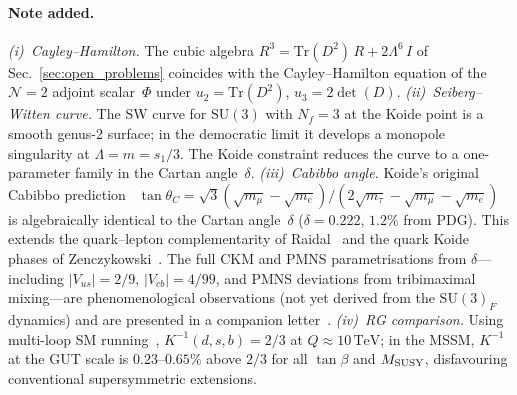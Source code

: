 \documentclass[aps,prd,twocolumn,showpacs,preprintnumbers,superscriptaddress,floatfix]{revtex4-2}
\newcommand{\SU}{\mathrm{SU}}
\newcommand{\Nf}{N_{\!f}}
\newcommand{\TeV}{\,\mathrm{TeV}}
\begin{document}
\paragraph*{Note added.}
\emph{(i)~Cayley--Hamilton.}
The cubic algebra $R^3 = \mathrm{Tr}(D^2)\,R + 2\Lambda^6\,I$ of
Sec.~\ref{sec:open_problems} coincides with the Cayley--Hamilton
equation of the $\mathcal{N}{=}2$ adjoint scalar~$\Phi$ under
$u_2 = \mathrm{Tr}(D^2)$, $u_3 = 2\det(D)$.
\emph{(ii)~Seiberg--Witten curve.}
The SW curve for $\SU(3)$ with $\Nf=3$ at the Koide point
is a smooth genus-2 surface; in the democratic limit it develops a
monopole singularity at $\Lambda = m = s_1/3$.
The Koide constraint reduces the curve to a one-parameter family
in the Cartan angle~$\delta$.
\emph{(iii)~Cabibbo angle.}
Koide's original Cabibbo prediction~\cite{Koide:1983qe}
$\tan\theta_C = \sqrt{3}(\sqrt{m_\mu} - \sqrt{m_e})/
(2\sqrt{m_\tau} - \sqrt{m_\mu} - \sqrt{m_e})$
is algebraically identical to the Cartan angle~$\delta$
($\delta = 0.222$, $1.2\%$ from PDG).
This extends the quark--lepton complementarity of
Raidal~\cite{Raidal:2004} and the quark Koide phases of
Zenczykowski~\cite{Zenczykowski:2012}.
The full CKM and PMNS parametrisations from $\delta$---including
$|V_{us}| = 2/9$, $|V_{cb}| = 4/99$, and PMNS deviations from
tribimaximal mixing---are phenomenological observations
(not yet derived from the $\SU(3)_F$ dynamics) and are presented
in a companion letter~\cite{companion:PRL}.
\emph{(iv)~RG comparison.}
Using multi-loop SM running~\cite{AHS:2024,MartinRobertson:2019},
$K^{-1}(d,s,b) = 2/3$ at $Q \approx 10\TeV$;
in the MSSM, $K^{-1}$ at the GUT scale is $0.23$--$0.65\%$
above $2/3$ for all $\tan\beta$ and $M_{\rm SUSY}$, disfavouring
conventional supersymmetric extensions.
\end{document}
